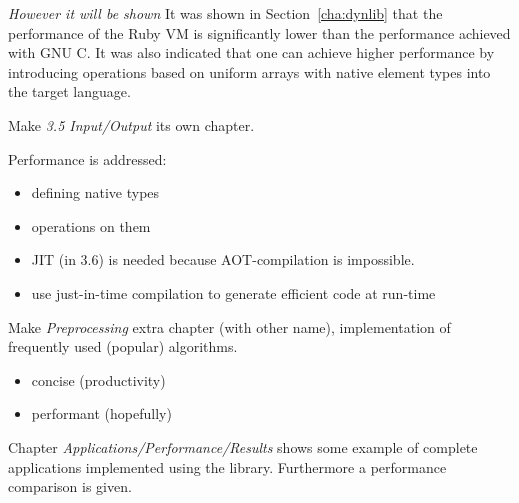 \documentclass[10pt,a4paper,twoside,openright]{book}
\newcommand{\sex}[1]{Section~\ref{cha:#1}}
\begin{document}
\begin{footnotesize}
\emph{However it will be shown} It was shown in \sex{dynlib} that the performance of the Ruby \ac{VM} is significantly lower than the performance achieved with \acs{GNU} C. It was also indicated that one can achieve higher performance by introducing operations based on uniform arrays with native element types into the target language.
\end{footnotesize}

Make \emph{3.5 Input/Output} its own chapter.

Performance is addressed:
\begin{itemize}
\item defining native types
\item operations on them
\item JIT (in 3.6) is needed because AOT-compilation is impossible.
\item use just-in-time compilation to generate efficient code at run-time
\end{itemize}

Make \emph{Preprocessing} extra chapter (with other name), implementation of frequently used (popular) algorithms.
\begin{itemize}
\item concise (productivity)
\item performant (hopefully)
\end{itemize}

Chapter \emph{Applications/Performance/Results} shows some example of complete applications implemented using the library. Furthermore a performance comparison is given.
\end{document}
